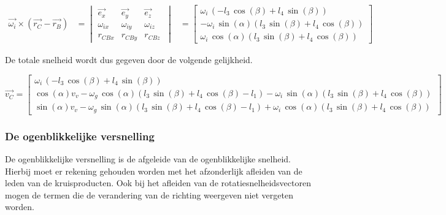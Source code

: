 \begin{equation*}
\begin{split}
\overrightarrow{\omega_{i}}\times(\overrightarrow{r_{C}}-\overrightarrow{r_{B}})
&=	\begin{vmatrix}
	\overrightarrow{e_{x}} & \overrightarrow{e_{y}} & \overrightarrow{e_{z}}\\
	\omega_{ix} & \omega_{iy} & \omega_{iz}\\
	r_{CBx} & r_{CBy} & r_{CBz}\
	\end{vmatrix}
&=	\begin{bmatrix}
	\omega_{i}\, \left( -l_{3}\,\cos \left( \beta \right) +l_{4}\,\sin \left( \beta\right)  \right) \\
	-\omega_{i}\,\sin \left( \alpha \right)  \left( l_{3}\,\sin \left( \beta \right) +l_{4}\,\cos \left( \beta \right) \right) \\
	\omega_{i}\,\cos \left( \alpha \right) \left( l_{3}\,\sin \left( \beta \right) +l_{4}\,\cos \left( \beta\right)  \right) \
	\end{bmatrix}
\end{split}
\end{equation*}

De totale snelheid wordt dus gegeven door de volgende gelijkheid.

\begin{equation*}
\overrightarrow{v_{C}}=
\begin{bmatrix}
\omega_{i}\, \left( -l_{3}\,\cos \left( \beta \right) +l_{4}\,\sin \left( \beta\right)  \right) \\

\cos \left( \alpha \right) v_{v}-\omega_{g}\,\cos\left( \alpha \right)  \left( l_{3}\,\sin \left( \beta \right) +l_{4}\,\cos \left( \beta \right) -l_{1} \right) -\omega_{i}\,\sin \left( \alpha \right)  \left( l_{3}\,\sin \left( \beta \right) +l_{4}\,\cos\left( \beta \right)  \right) \\

\sin \left( \alpha\right) v_{v}-\omega_{g}\,\sin \left( \alpha \right)  \left( l_{3}\,\sin \left( \beta \right) +l_{4}\,\cos \left( \beta \right) -l_{1}\right) +\omega_{i}\,\cos \left( \alpha \right)  \left( l_{3}\,\sin\left( \beta \right) +l_{4}\,\cos \left( \beta \right)  \right)\
\end{bmatrix}
\end{equation*}

\subsubsection{De ogenblikkelijke versnelling} \label{versn_c}
De ogenblikkelijke versnelling is de afgeleide van de ogenblikkelijke snelheid. Hierbij moet er rekening gehouden worden met het afzonderlijk afleiden van de leden van de kruisproducten. Ook bij het afleiden van de rotatiesnelheidsvectoren mogen de termen die de verandering van de richting weergeven niet vergeten worden.

